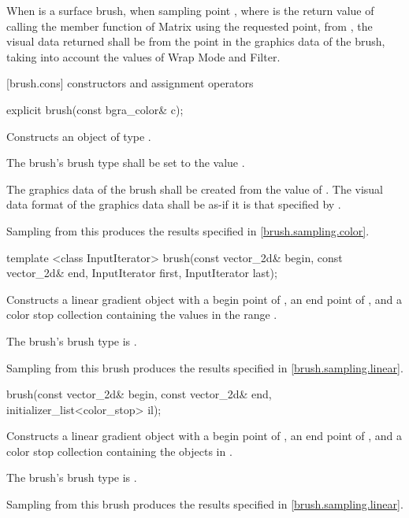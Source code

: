 \pnum
When  is a surface brush, when sampling point , where  is the return value of calling the  member function of Matrix using the requested point, from , the visual data returned shall be from the point  in the graphics data of the brush, taking into account the values of Wrap Mode and Filter.

 [brush.cons] { constructors and assignment operators}

\begin{itemdecl}
explicit brush(const bgra_color& c);
\end{itemdecl}
\begin{itemdescr}
\pnum
\effects
Constructs an object of type .

\pnum
The brush's brush type shall be set to the value .

\pnum
The graphics data of the brush shall be created from the value of . The visual data format of the graphics data shall be as-if it is that specified by .

\pnum
\remarks
Sampling from this produces the results specified in \ref{brush.sampling.color}.
\end{itemdescr}

\begin{itemdecl}
template <class InputIterator>
brush(const vector_2d& begin, const vector_2d& end,
  InputIterator first, InputIterator last);
\end{itemdecl}
\begin{itemdescr}
\pnum
\effects
Constructs a linear gradient  object with a begin point of , an end point of , and a color stop collection containing the values in the range .

\pnum
The brush's brush type is .

\pnum
\remarks
Sampling from this brush produces the results specified in \ref{brush.sampling.linear}.
\end{itemdescr}

\begin{itemdecl}
brush(const vector_2d& begin, const vector_2d& end,
  initializer_list<color_stop> il);
\end{itemdecl}
\begin{itemdescr}
\pnum
\effects
Constructs a linear gradient  object with a begin point of , an end point of , and a color stop collection containing the  objects in .

\pnum
The brush's brush type is .

\pnum
\remarks
Sampling from this brush produces the results specified in \ref{brush.sampling.linear}.
\end{itemdescr}

